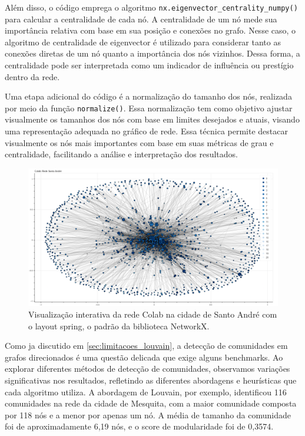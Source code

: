 Além disso, o código emprega o algoritmo \texttt{nx.eigenvector\_centrality\_numpy()} para calcular a centralidade de cada nó. A centralidade de um nó mede sua importância relativa com base em sua posição e conexões no grafo. Nesse caso, o algoritmo de centralidade de eigenvector é utilizado para considerar tanto as conexões diretas de um nó quanto a importância dos nós vizinhos. Dessa forma, a centralidade pode ser interpretada como um indicador de influência ou prestígio dentro da rede.

Uma etapa adicional do código é a normalização do tamanho dos nós, realizada por meio da função \texttt{normalize()}. Essa normalização tem como objetivo ajustar visualmente os tamanhos dos nós com base em limites desejados e atuais, visando uma representação adequada no gráfico de rede. Essa técnica permite destacar visualmente os nós mais importantes com base em suas métricas de grau e centralidade, facilitando a análise e interpretação dos resultados.

\begin{figure}[h]
    \centering
    \includegraphics[scale=0.3]{images/bokeh_plot_santo_andre.png}
    \caption{Visualização interativa da rede Colab na cidade de Santo André com o layout spring, o padrão da biblioteca NetworkX.}
    \label{fig:bokeh_plot_santo_andre}
	\fautor
\end{figure}

Como ja discutido em \autoref{sec:limitacoes_louvain}, a detecção de comunidades em grafos direcionados é uma questão delicada que exige alguns benchmarks. Ao explorar diferentes métodos de detecção de comunidades, observamos variações significativas nos resultados, refletindo as diferentes abordagens e heurísticas que cada algoritmo utiliza. A abordagem de Louvain, por exemplo, identificou 116 comunidades na rede da cidade de Mesquita, com a maior comunidade composta por 118 nós e a menor por apenas um nó. A média de tamanho da comunidade foi de aproximadamente 6,19 nós, e o score de modularidade foi de 0,3574.

